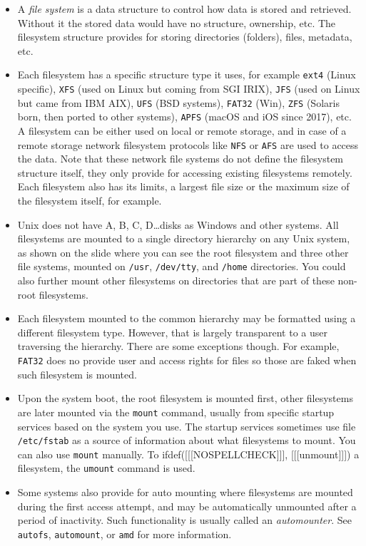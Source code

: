 \begin{itemize}
\item A \emph{file system} is a data structure to control how data is stored and
retrieved.  Without it the stored data would have no structure, ownership, etc.
The filesystem structure provides for storing directories (folders), files,
metadata, etc.
\item Each filesystem has a specific structure type it uses, for example
\texttt{ext4} (Linux specific), \texttt{XFS} (used on Linux but coming from SGI
IRIX), \texttt{JFS} (used on Linux but came from IBM AIX), \texttt{UFS} (BSD
systems), \texttt{FAT32} (Win), \texttt{ZFS} (Solaris born, then ported to other
systems), \texttt{APFS} (macOS and iOS since 2017), etc.  A filesystem can be
either used on local or remote storage, and in case of a remote storage network
filesystem protocols like \texttt{NFS} or \texttt{AFS} are used to access the
data.  Note that these network file systems do not define the filesystem
structure itself, they only provide for accessing existing filesystems remotely.
Each filesystem also has its limits, a largest file size or the maximum size of
the filesystem itself, for example.
\item Unix does not have A, B, C, D\dots disks as Windows and other systems.
All filesystems are mounted to a single directory hierarchy on any Unix system,
as shown on the slide where you can see the root filesystem and three other
file systems, mounted on \texttt{/usr}, \texttt{/dev/tty}, and \texttt{/home}
directories.  You could also further mount other filesystems on directories that
are part of these non-root filesystems.
\item Each filesystem mounted to the common hierarchy may be formatted using a
different filesystem type.  However, that is largely transparent to a user
traversing the hierarchy.  There are some exceptions though.  For example,
\texttt{FAT32} does no provide user and access rights for files so those are
faked when such filesystem is mounted.
\item Upon the system boot, the root filesystem is mounted first, other
filesystems are later mounted via the \texttt{mount} command, usually from
specific startup services based on the system you use.  The startup services
sometimes use file \texttt{/etc/fstab} as a source of information about what
filesystems to mount.  You can also use \texttt{mount} manually.
To ifdef([[[NOSPELLCHECK]]], [[[unmount]]]) a filesystem, the \texttt{umount}
command is used.
\item Some systems also provide for auto mounting where filesystems are mounted
during the first access attempt, and may be automatically unmounted after a
period of inactivity.  Such functionality is usually called an
\emph{automounter}.  See \texttt{autofs}, \texttt{automount}, or \texttt{amd}
for more information.
\end{itemize}

